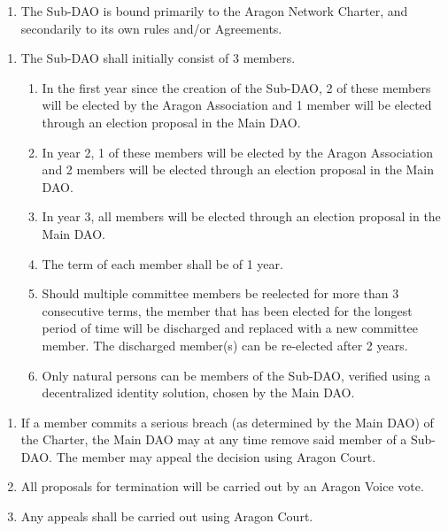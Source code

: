 
\label{chap:SubDAOAgreements}

\begin{enumerate}
	
	\begin{enumerate}
		
		\begin{enumerate}
			\item The Sub-\ac{DAO} is bound primarily to the Aragon Network Charter, and secondarily to its own rules and/or Agreements.
		\end{enumerate}
		
		\begin{enumerate}
			\item The Sub-\ac{DAO} shall initially consist of 3 members.
			\begin{enumerate}
				\item In the first year since the creation of the Sub-\ac{DAO}, 2 of these members will be elected by the Aragon Association and 1 member will be elected through an election proposal in the Main \ac{DAO}.
				\item In year 2, 1 of these members will be elected by the Aragon Association and 2 members will be elected through an election proposal in the Main \ac{DAO}.
				\item In year 3, all members will be elected through an election proposal in the Main \ac{DAO}.
				\item The term of each member shall be of 1 year.
				\item Should multiple committee members be reelected for more than 3 consecutive terms, the member that has been elected for the longest period of time will be discharged and replaced with a new committee member.
				The discharged member(s) can be re-elected after 2 years.
				\item Only natural persons can be members of the Sub-\ac{DAO}, verified using a decentralized identity solution, chosen by the Main \ac{DAO}.
			\end{enumerate}
		\end{enumerate}
		
		\begin{enumerate}
			\item If a member commits a serious breach (as determined by the Main \ac{DAO}) of the Charter, the Main \ac{DAO} may at any time remove said member of a Sub-\ac{DAO}.
			The member may appeal the decision using Aragon Court.
			\item All proposals for termination will be carried out by an Aragon Voice vote.
			\item Any appeals shall be carried out using Aragon Court.
		\end{enumerate}
		

\end{enumerate}
\end{enumerate}
